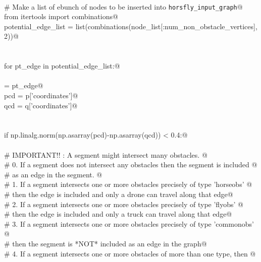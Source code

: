 \documentclass[11.5pt]{report}
\begin{document}
\begin{flushleft}
\begin{minipage}{\linewidth}
\begin{list}{}{}
\mbox{}\verb@@\\
\mbox{}\verb@    # Make a list of ebunch of nodes to be inserted into \verb|horsfly_input_graph|@\\
\mbox{}\verb@    from itertools import combinations@\\
\mbox{}\verb@    potential_edge_list = list(combinations(node_list[:num_non_obstacle_vertices], 2))@\\
\mbox{}\verb@@\\
\mbox{}\verb@@\\
\mbox{}\verb@    for pt_edge in potential_edge_list:@\\
\mbox{}\verb@@\\
\mbox{}\verb@         [p,q] = pt_edge@\\
\mbox{}\verb@         pcd = p['coordinates']@\\
\mbox{}\verb@         qcd = q['coordinates']@\\
\mbox{}\verb@@\\
\mbox{}\verb@@\\
\mbox{}\verb@         if np.linalg.norm(np.asarray(pcd)-np.asarray(qcd)) < 0.4:@\\
\mbox{}\verb@@\\
\mbox{}\verb@             # IMPORTANT!! : A segment might intersect many obstacles. @\\
\mbox{}\verb@             # 0. If a segment does not intersect any obstacles then the segment is included @\\
\mbox{}\verb@             #    as an edge in the segment.  @\\
\mbox{}\verb@             # 1. If a segment intersects one or more obstacles precisely of type 'horseobs' @\\
\mbox{}\verb@             #    then the edge is included and only a drone can travel along that edge@\\
\mbox{}\verb@             # 2. If a segment intersects one or more obstacles precisely of type 'flyobs' @\\
\mbox{}\verb@             #    then the edge is included and only a truck can travel along that edge@\\
\mbox{}\verb@             # 3. If a segment intersects one or more obstacles precisely of type 'commonobs' @\\
\mbox{}\verb@             #    then the segment is *NOT* included as an edge in the graph@\\
\mbox{}\verb@             # 4. If a segment intersects one or more obstacles of more than one type, then @\\

\end{list}
\end{minipage}
\end{flushleft}
\end{document}
